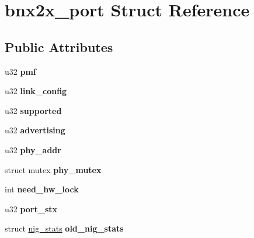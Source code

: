 \hypertarget{structbnx2x__port}{
\section{bnx2x\_\-port Struct Reference}
\label{structbnx2x__port}
}
\subsection*{Public Attributes}
\begin{DoxyCompactItemize}
\item 
\hypertarget{structbnx2x__port_a2a8cf05700a9018888c9984d60bd8b42}{
u32 {\bfseries pmf}}
\label{structbnx2x__port_a2a8cf05700a9018888c9984d60bd8b42}

\item 
\hypertarget{structbnx2x__port_a58c0f2a21e7ac676f3ee42d97bf1df25}{
u32 {\bfseries link\_\-config}}
\label{structbnx2x__port_a58c0f2a21e7ac676f3ee42d97bf1df25}

\item 
\hypertarget{structbnx2x__port_a99f8eaaac72bed592fcc852f56364645}{
u32 {\bfseries supported}}
\label{structbnx2x__port_a99f8eaaac72bed592fcc852f56364645}

\item 
\hypertarget{structbnx2x__port_aaa1c20718a5f914434bc1b16d45a83ee}{
u32 {\bfseries advertising}}
\label{structbnx2x__port_aaa1c20718a5f914434bc1b16d45a83ee}

\item 
\hypertarget{structbnx2x__port_a6ebb8d01f54b1ea05111583c32680d1c}{
u32 {\bfseries phy\_\-addr}}
\label{structbnx2x__port_a6ebb8d01f54b1ea05111583c32680d1c}

\item 
\hypertarget{structbnx2x__port_ac4c41d1cf46d850d58daa1b98cec23db}{
struct mutex {\bfseries phy\_\-mutex}}
\label{structbnx2x__port_ac4c41d1cf46d850d58daa1b98cec23db}

\item 
\hypertarget{structbnx2x__port_ab993d5e46bb7d2a6ac7e719b21ad7815}{
int {\bfseries need\_\-hw\_\-lock}}
\label{structbnx2x__port_ab993d5e46bb7d2a6ac7e719b21ad7815}

\item 
\hypertarget{structbnx2x__port_a4c64e96ae322abac3076be9dc512a6cd}{
u32 {\bfseries port\_\-stx}}
\label{structbnx2x__port_a4c64e96ae322abac3076be9dc512a6cd}

\item 
\hypertarget{structbnx2x__port_af942d0ce624bdb4777e9e78cbc22c452}{
struct \hyperlink{structnig__stats}{nig\_\-stats} {\bfseries old\_\-nig\_\-stats}}
\label{structbnx2x__port_af942d0ce624bdb4777e9e78cbc22c452}

\end{DoxyCompactItemize}


